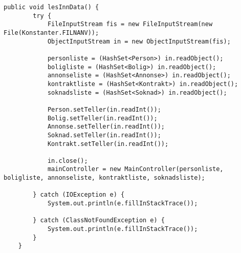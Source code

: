 \begin{lstlisting}[caption=Innlesing av serialisert data.,label=kode:ser2]
    public void lesInnData() {
        try {
            FileInputStream fis = new FileInputStream(new File(Konstanter.FILNANV));
            ObjectInputStream in = new ObjectInputStream(fis);

            personliste = (HashSet<Person>) in.readObject();
            boligliste = (HashSet<Bolig>) in.readObject();
            annonseliste = (HashSet<Annonse>) in.readObject();
            kontraktliste = (HashSet<Kontrakt>) in.readObject();
            soknadsliste = (HashSet<Soknad>) in.readObject();

            Person.setTeller(in.readInt());
            Bolig.setTeller(in.readInt());
            Annonse.setTeller(in.readInt());
            Soknad.setTeller(in.readInt());
            Kontrakt.setTeller(in.readInt());

            in.close();
            mainController = new MainController(personliste, boligliste, annonseliste, kontraktliste, soknadsliste);

        } catch (IOException e) {
            System.out.println(e.fillInStackTrace());

        } catch (ClassNotFoundException e) {
            System.out.println(e.fillInStackTrace());
        }
    }
\end{lstlisting}